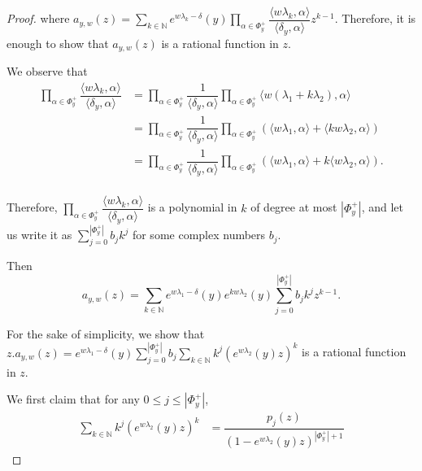 \documentclass[11 pt]{amsart}
\newcommand{\N}{{\mathbb N}}
\theoremstyle{definition}
\numberwithin{equation}{section}
\begin{document}
\begin{proof}
\noindent where $a_{y,w} (z) = \sum\limits_{k \in \N} e ^{w \lambda_k -\delta }(y) \prod\limits_{\alpha \in \Phi_y^+} \dfrac{\langle w \lambda_k , \alpha \rangle }{\langle \delta_y , \alpha \rangle} z^{k-1}$. 
 Therefore, it is enough to show that $a_{y,w}(z)$ is a rational function in $z$. 
 
\noindent We observe that
 \begin{equation}
 \begin{split}
 \prod\limits_{\alpha \in \Phi_y^+} \dfrac{\langle w \lambda_k , \alpha \rangle }{ \langle \delta_y, \alpha \rangle }
 & = \prod\limits_{\alpha \in \Phi_y^+} \dfrac{1}{\langle \delta_y, \alpha \rangle } \prod\limits_{\alpha \in \Phi_y^+} \langle w (\lambda_1 + k \lambda_2 ) , \alpha \rangle \\
 & = \prod\limits_{\alpha \in \Phi_y^+} \dfrac{1}{\langle \delta_y, \alpha \rangle} \prod\limits_{\alpha \in \Phi_y^+} ( \langle w \lambda_1, \alpha \rangle + \langle k w \lambda_2, \alpha \rangle )\\
 & = \prod\limits_{\alpha \in \Phi_y^+} \dfrac{1}{\langle \delta_y, \alpha \rangle} \prod\limits_{\alpha \in \Phi_y^+}( \langle w \lambda_1 , \alpha \rangle + k \langle w \lambda_2, \alpha \rangle ).\\
\end{split}
\end{equation} 

\noindent Therefore, $\prod\limits_{\alpha \in \Phi_y^+} \dfrac{\langle w \lambda_k , \alpha \rangle }{\langle \delta_y , \alpha \rangle}$ is a polynomial in $k$ of degree at most $|\Phi_y^+|$, and let us write it as $\sum\limits_{j=0}^{|\Phi_y^+|} b_j k^j$ for some complex numbers $b_j$. 


\noindent Then $$a_{y,w}(z)=\sum\limits_{k \in \N} e^{w \lambda_1 - \delta}(y) e^{k w \lambda_2} (y) \sum\limits_{j=0}^{|\Phi_y^+|} b_j k^j z^{k-1}.$$


\noindent For the sake of simplicity, we show that $z . a_{y,w}(z)= e^{w \lambda_1-\delta}(y) \sum\limits_{j=0}^{|\Phi_y^+|} b_j \sum\limits_{k \in \N} k ^j (e^{w \lambda_2}(y) z )^k$ is a rational function in $z$.

\noindent We first claim that for any $0 \leq j \leq |\Phi_y^+|$, 
\vspace{2pt}
\begin{equation}\label{claim}
\begin{split}
\sum\limits_{k \in \N} k^j (e ^{w \lambda_2}(y) z )^k 
& = \dfrac{p_j(z)}{(1-e^{w \lambda_2}(y)z)^{|\Phi_y^+| +1}}
\end{split}
\end{equation}


\end{proof}
\end{document}
